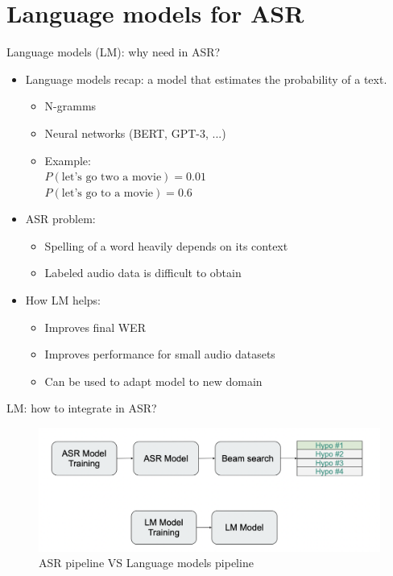 \section{Language models for ASR}
\begin{frame}{Language models (LM): why need in ASR?}
\begin{itemize}
    \item Language models recap: a model that estimates the probability of a text.
    \begin{itemize}
        \item N-gramms
        \item Neural networks (BERT, GPT-3, ...)
        \item Example: \\
        $P(\text{let’s go two a movie}) = 0.01$\\
        $P(\text{let’s go to a movie}) = 0.6$
    \end{itemize}
    
    \item ASR problem:
    \begin{itemize}
        \item Spelling of a word heavily depends on its context
        \item Labeled audio data is difficult to obtain
    \end{itemize}

    \item How LM helps: 
        \begin{itemize}
            \item Improves final WER
            \item Improves performance for small audio datasets
            \item Can be used to adapt model to new domain
        \end{itemize}
\end{itemize}
\end{frame}
\begin{frame}{LM: how to integrate in ASR?}
    \begin{figure}
    	\centering
    	\includegraphics[width=0.99\linewidth]{figs/lm_vs_asr.png}
    	\caption{ASR pipeline VS Language models pipeline}
    \end{figure}
    
\end{frame}
